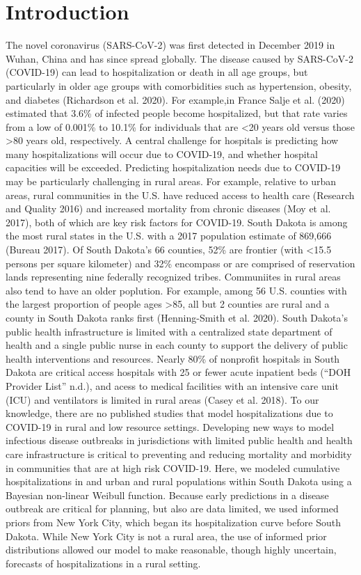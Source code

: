 \documentclass[
]{article}
\begin{document}
\hypertarget{introduction}{%
\section{Introduction}\label{introduction}}

The novel coronavirus (SARS-CoV-2) was first detected in December 2019 in Wuhan, China and has since spread globally. The disease caused by SARS-CoV-2 (COVID-19) can lead to hospitalization or death in all age groups, but particularly in older age groups with comorbidities such as hypertension, obesity, and diabetes (Richardson et al. 2020). For example,in France Salje et al. (2020) estimated that 3.6\% of infected people become hospitalized, but that rate varies from a low of 0.001\% to 10.1\% for individuals that are \textless20 years old versus those \textgreater80 years old, respectively. A central challenge for hospitals is predicting how many hospitalizations will occur due to COVID-19, and whether hospital capacities will be exceeded.
Predicting hospitalization needs due to COVID-19 may be particularly challenging in rural areas. For example, relative to urban areas, rural communities in the U.S. have reduced access to health care (Research and Quality 2016) and increased mortality from chronic diseases (Moy et al. 2017), both of which are key risk factors for COVID-19. South Dakota is among the most rural states in the U.S. with a 2017 population estimate of 869,666 (Bureau 2017). Of South Dakota's 66 counties, 52\% are frontier (with \textless15.5 persons per square kilometer) and 32\% encompass or are comprised of reservation lands representing nine federally recognized tribes. Communiites in rural areas also tend to have an older poplution. For example, among 56 U.S. counties with the largest proportion of people ages \textgreater85, all but 2 counties are rural and a county in South Dakota ranks first (Henning-Smith et al. 2020). South Dakota's public health infrastructure is limited with a centralized state department of health and a single public nurse in each county to support the delivery of public health interventions and resources. Nearly 80\% of nonprofit hospitals in South Dakota are critical access hospitals with 25 or fewer acute inpatient beds (``DOH Provider List'' n.d.), and acess to medical facilities with an intensive care unit (ICU) and ventilators is limited in rural areas (Casey et al. 2018).
To our knowledge, there are no published studies that model hospitalizations due to COVID-19 in rural and low resource settings. Developing new ways to model infectious disease outbreaks in jurisdictions with limited public health and health care infrastructure is critical to preventing and reducing mortality and morbidity in communities that are at high risk COVID-19. Here, we modeled cumulative hospitalizations in and urban and rural populations within South Dakota using a Bayesian non-linear Weibull function. Because early predictions in a disease outbreak are critical for planning, but also are data limited, we used informed priors from New York City, which began its hospitalization curve before South Dakota. While New York City is not a rural area, the use of informed prior distributions allowed our model to make reasonable, though highly uncertain, forecasts of hospitalizations in a rural setting.
\end{document}
